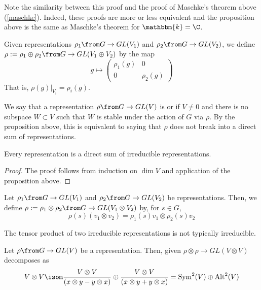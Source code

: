 \documentclass[11pt,leqno,oneside]{amsbook}
\newcommand{\bbk}{\mathbbm{k}}
\numberwithin{thm}{section}
\begin{document}
\begin{rmk}
  Note the similarity between this proof and the proof of Maschke's
  theorem above (\ref{maschke}). Indeed, these proofs are more or less
  equivalent and the proposition above is the same as Maschke's
  theorem for \(\bbk = \C\).
\end{rmk}
\begin{defn}
  Given representations \(\rho_1 \from G \to GL(V_1)\) and \(\rho_2 \from
  G \to GL(V_2)\), we define \(\rho := \rho_1 \oplus \rho_2 \from G \to GL(V_1
  \oplus V_2)\) by the map \[
    g \mapsto \left(
      \begin{array}{cc}
        \rho_1(g)&0\\
        0&\rho_2(g)
      \end{array}
    \right)
  \]
  That is, \(\rho(g)|_{V_i} = \rho_i(g)\).
\end{defn}
\begin{defn}
  We say that a representation \(\rho \from G \to GL(V)\) is
   or  if \(V \neq 0\) and there is no
  subspace \(W
  \subset V\) such that \(W\) is stable under the action of \(G\) via
  \(\rho\). By the proposition above, this is equivalent to saying
  that \(\rho\) does not break into a direct sum of representations.
\end{defn}
\begin{prop}
  Every representation is a direct sum of irreducible representations.
\end{prop}
\begin{proof}
  The proof follows from induction on \(\dim V\) and application of
  the proposition above.
\end{proof}
\begin{defn}
  Let \(\rho_1 \from G \to GL(V_1)\) and \(\rho_2 \from G \to
  GL(V_2)\) be representations. Then, we define \(\rho := \rho_1
  \otimes \rho_2 \from G \to GL(V_1 \otimes V_2)\) by, for \(s \in G\), \[
    \rho(s)(v_1 \otimes v_2) = \rho_1(s)v_1 \otimes \rho_2(s) v_2
  \]
\end{defn}
\begin{rmk}
  The tensor product of two irreducible representations is not
  typically irreducible. 
\end{rmk}
\begin{thm}
  Let \(\rho \from G \to GL(V)\) be a representation. Then, given
  \(\rho \otimes \rho \to GL(V \otimes V)\) decomposes as \[
    V \otimes V \isom \frac{V \otimes V}{(x \otimes y - y \otimes x)} \oplus
    \frac{V \otimes V}{(x \otimes y + y \otimes x)} =
    \operatorname{Sym}^2(V) \oplus \operatorname{Alt}^2(V)
  \]
\end{thm}
\end{document}
